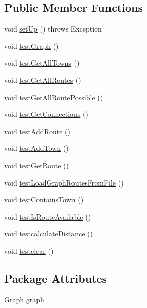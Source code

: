 \subsection*{Public Member Functions}
\begin{DoxyCompactItemize}
\item 
void \hyperlink{classtest_1_1_graph_test_a2e6d2327f0ae6fc3f3d5de35eebe31dd}{set\+Up} ()  throws Exception 
\item 
void \hyperlink{classtest_1_1_graph_test_a1424d27d4fc5a3dca08a058d4d49a53a}{test\+Graph} ()
\item 
void \hyperlink{classtest_1_1_graph_test_a8979ac672a459b1549444d94b4e4b46f}{test\+Get\+All\+Towns} ()
\item 
void \hyperlink{classtest_1_1_graph_test_a3c859de54ad38354bbfe0a99f79ab817}{test\+Get\+All\+Routes} ()
\item 
void \hyperlink{classtest_1_1_graph_test_a6ba6493ed4d053e9476f9e15744f4f11}{test\+Get\+All\+Route\+Possible} ()
\item 
void \hyperlink{classtest_1_1_graph_test_a6e5d6e42cbf0773c9fde59fbb0e38056}{test\+Get\+Connections} ()
\item 
void \hyperlink{classtest_1_1_graph_test_ab7eeb2aca803777eafaca3a6da72ab9e}{test\+Add\+Route} ()
\item 
void \hyperlink{classtest_1_1_graph_test_a473c660cf4912cd95c878c538b99de05}{test\+Add\+Town} ()
\item 
void \hyperlink{classtest_1_1_graph_test_a44c05e3ce8e8f248813e7f7073b83b40}{test\+Get\+Route} ()
\item 
void \hyperlink{classtest_1_1_graph_test_a7ad18b1ef2adc9632a7334f1ea1aa81a}{test\+Load\+Graph\+Routes\+From\+File} ()
\item 
void \hyperlink{classtest_1_1_graph_test_af2355b40a0a4852b32d3d956ec244539}{test\+Contains\+Town} ()
\item 
void \hyperlink{classtest_1_1_graph_test_a35b38c797fb3d3c1ffc0e3ebaf9c36b2}{test\+Is\+Route\+Available} ()
\item 
void \hyperlink{classtest_1_1_graph_test_a58d63fd09c3102ebb1e07b88fd588831}{testcalculate\+Distance} ()
\item 
void \hyperlink{classtest_1_1_graph_test_a285eb6f04b41f2e1b255b387a2e88199}{testclear} ()
\end{DoxyCompactItemize}
\subsection*{Package Attributes}
\begin{DoxyCompactItemize}
\item 
\hyperlink{classdomain_1_1_graph}{Graph} \hyperlink{classtest_1_1_graph_test_ae9228c27cb865d920edd8b2eaad55b96}{graph}
\end{DoxyCompactItemize}


